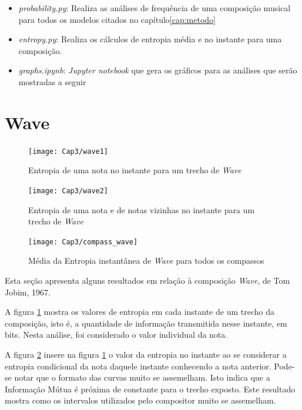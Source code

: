 \begin{itemize}
    \item \textit{probability.py}: Realiza as análises de frequência de uma composição musical para todos os modelos citados no capítulo\ref{cap:metodo}
    \item \textit{entropy.py}: Realiza os cálculos de entropia média e no instante para uma composição.
    \item \textit{graphs.ipynb}: \textit{Jupyter notebook} que gera os gráficos para as análises que serão mostradas a seguir
\end{itemize}

\section{Wave}

\begin{figure}[h]
\centering
\texttt{[image: Cap3/wave1]}
\caption{Entropia de uma nota no instante para um trecho de \textit{Wave}}
\label{fig:wave1}
\end{figure}

\begin{figure}[h]
\centering
\texttt{[image: Cap3/wave2]}
\caption{Entropia de uma nota e de notas vizinhas no instante para um trecho de \textit{Wave}}
\label{fig:wave2}
\end{figure}

\begin{figure}[h]
\centering
\texttt{[image: Cap3/compass\_wave]}
\caption{Média da Entropia instantânea de \textit{Wave} para todos os compassos}
\label{fig:compass_wave}
\end{figure}
Esta seção apresenta alguns resultados em relação à composição \textit{Wave}, de Tom Jobim, 1967. \cite{wave}

A figura \ref{fig:wave1} mostra os valores de entropia em cada instante de um trecho da composição, isto é, a quantidade de informação transmitida nesse instante, em bits. Nesta análise, foi considerado o valor individual da nota.


A figura \ref{fig:wave2} insere na figura \ref{fig:wave1} o valor da entropia no instante ao se considerar a entropia condicional da nota daquele instante conhecendo a nota anterior. Pode-se notar que o formato das curvas muito se assemelham. Isto indica que a Informação Mútua é próxima de constante para o trecho exposto. Este resultado mostra como os intervalos utilizados pelo compositor muito se assemelham.


